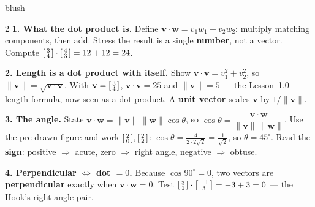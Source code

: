\documentclass[10pt]{article}
\newcommand{\vv}{\mathbf{v}}
\newcommand{\ww}{\mathbf{w}}
\begin{document}
\begin{skillbox}[Lesson]{blush}
\begin{multicols}{2}
\textbf{1. What the dot product is.} Define $\vv\cdot\ww=v_1w_1+v_2w_2$: multiply matching
components, then add. Stress the result is a single \textbf{number}, not a vector. Compute
$\begin{bsmallmatrix} 3\\4 \end{bsmallmatrix}\cdot\begin{bsmallmatrix} 4\\3 \end{bsmallmatrix}=12+12=24$.

\textbf{2. Length is a dot product with itself.} Show $\vv\cdot\vv=v_1^2+v_2^2$, so
$\|\vv\|=\sqrt{\vv\cdot\vv}$. With $\vv=\begin{bsmallmatrix} 3\\4 \end{bsmallmatrix}$,
$\vv\cdot\vv=25$ and $\|\vv\|=5$ --- the Lesson~1.0 length formula, now seen as a dot product.
A \textbf{unit vector} scales $\vv$ by $1/\|\vv\|$.

\columnbreak

\textbf{3. The angle.} State $\vv\cdot\ww=\|\vv\|\,\|\ww\|\cos\theta$, so
$\cos\theta=\dfrac{\vv\cdot\ww}{\|\vv\|\,\|\ww\|}$. Use the pre-drawn figure and work
$\begin{bsmallmatrix} 2\\0 \end{bsmallmatrix},\begin{bsmallmatrix} 2\\2 \end{bsmallmatrix}$:
$\cos\theta=\tfrac{4}{2\cdot 2\sqrt2}=\tfrac{1}{\sqrt2}$, so $\theta=45^\circ$. Read the
\textbf{sign}: positive $\Rightarrow$ acute, zero $\Rightarrow$ right angle, negative
$\Rightarrow$ obtuse.

\textbf{4. Perpendicular $\Leftrightarrow$ dot $=0$.} Because $\cos 90^\circ=0$, two vectors are
\textbf{perpendicular} exactly when $\vv\cdot\ww=0$. Test
$\begin{bsmallmatrix} 3\\1 \end{bsmallmatrix}\cdot\begin{bsmallmatrix} -1\\3 \end{bsmallmatrix}=-3+3=0$
--- the Hook's right-angle pair.
\end{multicols}
\end{skillbox}
\end{document}

